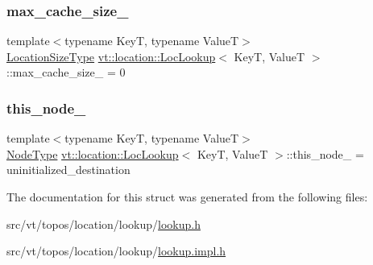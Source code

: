 \subsubsection{\texorpdfstring{max\+\_\+cache\+\_\+size\+\_\+}{max\_cache\_size\_}}
{\footnotesize\ttfamily template$<$typename KeyT, typename ValueT$>$ \\
\hyperlink{namespacevt_1_1location_ab1c4c5849012a23eee2fbd1fce6159d7}{Location\+Size\+Type} \hyperlink{structvt_1_1location_1_1_loc_lookup}{vt\+::location\+::\+Loc\+Lookup}$<$ KeyT, ValueT $>$\+::max\+\_\+cache\+\_\+size\+\_\+ = 0\hspace{0.3cm}{\ttfamily [private]}}

\mbox{\label{structvt_1_1location_1_1_loc_lookup_aabefd8811a180654fc5b1fba649f32b2}} 
\subsubsection{\texorpdfstring{this\+\_\+node\+\_\+}{this\_node\_}}
{\footnotesize\ttfamily template$<$typename KeyT, typename ValueT$>$ \\
\hyperlink{namespacevt_a866da9d0efc19c0a1ce79e9e492f47e2}{Node\+Type} \hyperlink{structvt_1_1location_1_1_loc_lookup}{vt\+::location\+::\+Loc\+Lookup}$<$ KeyT, ValueT $>$\+::this\+\_\+node\+\_\+ = uninitialized\+\_\+destination\hspace{0.3cm}{\ttfamily [private]}}



The documentation for this struct was generated from the following files\+:\begin{DoxyCompactItemize}
\item 
src/vt/topos/location/lookup/\hyperlink{lookup_8h}{lookup.\+h}\item 
src/vt/topos/location/lookup/\hyperlink{lookup_8impl_8h}{lookup.\+impl.\+h}\end{DoxyCompactItemize}
